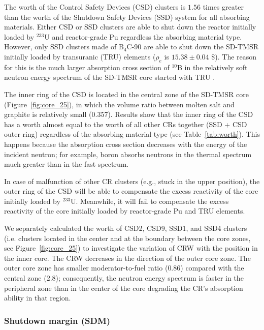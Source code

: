 The worth of the Control Safety Devices (CSD) clusters is $1.56$ times greater than 
the worth of the Shutdown Safety Devices (SSD) system for all absorbing materials. Either CSD or SSD 
clusters are able to shut down the reactor initially loaded by 
$^{233}$U and reactor-grade Pu regardless the absorbing material type.
However, only SSD clusters made of B$_4$C-90 are able to shut down the SD-TMSR 
initially loaded by transuranic (TRU) elements ($\rho_e$ is $15.38\pm0.04$ $\$$).
The reason for this is the much larger 
absorption cross section of $^{10}$B in the relatively soft neutron energy 
spectrum of the SD-TMSR core started with TRU \cite{ashraf2020Strategies}.

The inner ring of the CSD is located in the central zone of the SD-TMSR core 
(Figure~\ref{fig:core_25}), in which the volume ratio between molten salt and 
graphite is relatively small ($0.357$). Results show that the inner ring of the CSD has 
a worth almost equal to the worth of all other CRs together (SSD + CSD outer ring) regardless of 
the absorbing material type (see Table~\ref{tab:worth}). This happens because the absorption cross section
decreases with the energy of the incident neutron; for example, boron absorbs neutrons in the thermal spectrum much 
greater than in the fast spectrum.

In case of malfunction of other CR clusters (e.g., stuck in the upper 
position), the outer ring of the CSD will be able to compensate the excess reactivity of the core initially loaded by $^{233}$U.
Meanwhile, it will fail to compensate the excess 
reactivity of the core initially loaded by reactor-grade Pu and TRU elements.

We separately calculated the worth of CSD2, CSD9, SSD1, and SSD4 clusters (i.e. clusters located in the center and at the boundary between the core
zones, see Figure~\ref{fig:core_25}) to investigate the variation of CRW with the position in the inner core.
The CRW decreases in the direction of the outer core zone. The outer core zone 
has smaller moderator-to-fuel ratio ($0.86$) compared with the central zone 
($2.8$); consequently, the neutron energy spectrum is faster in the peripheral 
zone than in the center of the core degrading the CR's 
absorption ability in that region.

\subsubsection{Shutdown margin (SDM)}

